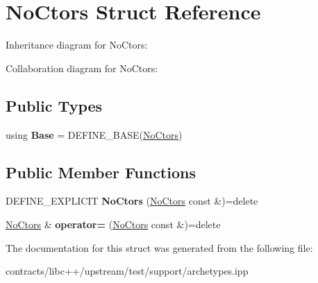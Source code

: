 \hypertarget{struct_no_ctors}{}\section{No\+Ctors Struct Reference}
\label{struct_no_ctors}


Inheritance diagram for No\+Ctors\+:


Collaboration diagram for No\+Ctors\+:
\subsection*{Public Types}
\begin{DoxyCompactItemize}
\item 
\mbox{\label{struct_no_ctors_aaa97d750b939b1437198e19607b7d6c4}} 
using {\bfseries Base} = D\+E\+F\+I\+N\+E\+\_\+\+B\+A\+SE(\mbox{\hyperlink{struct_no_ctors}{No\+Ctors}})
\end{DoxyCompactItemize}
\subsection*{Public Member Functions}
\begin{DoxyCompactItemize}
\item 
\mbox{\label{struct_no_ctors_ae2636fc9683f87ebc37cf5d4ad3ab7c1}} 
D\+E\+F\+I\+N\+E\+\_\+\+E\+X\+P\+L\+I\+C\+IT {\bfseries No\+Ctors} (\mbox{\hyperlink{struct_no_ctors}{No\+Ctors}} const \&)=delete
\item 
\mbox{\label{struct_no_ctors_a1f302b3fd14214a93aa9f9cf4f9493d5}} 
\mbox{\hyperlink{struct_no_ctors}{No\+Ctors}} \& {\bfseries operator=} (\mbox{\hyperlink{struct_no_ctors}{No\+Ctors}} const \&)=delete
\end{DoxyCompactItemize}


The documentation for this struct was generated from the following file\+:\begin{DoxyCompactItemize}
\item 
contracts/libc++/upstream/test/support/archetypes.\+ipp\end{DoxyCompactItemize}
